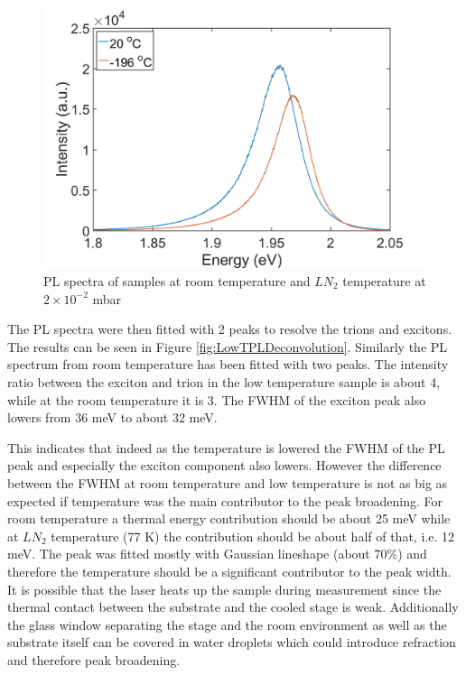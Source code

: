 \begin{figure}[!ht]
	\begin{center}
		\includegraphics[scale=0.4]{LowT/LowTPLComparison.png}
		\caption{PL spectra of samples at room temperature and $LN_2$ temperature at $2 \times 10^{-2}$ mbar}
		\label{fig:LowTPLComparison}
	\end{center}
\end{figure}

The PL spectra were then fitted with 2 peaks to resolve the trions and excitons. The results can be seen in Figure \ref{fig:LowTPLDeconvolution}. Similarly the PL spectrum from room temperature has been fitted with two peaks. The intensity ratio between the exciton and trion in the low temperature sample is about 4, while at the room temperature it is 3. The FWHM of the exciton peak also lowers from 36 meV to about 32 meV.

This indicates that indeed as the temperature is lowered the FWHM of the PL peak and especially the exciton component also lowers. However the difference between the FWHM at room temperature and low temperature is not as big as expected if temperature was the main contributor to the peak broadening. For room temperature a thermal energy contribution should be about 25 meV while at $LN_2$ temperature (77 K) the contribution should be about half of that, i.e. 12 meV. The peak was fitted mostly with Gaussian lineshape (about 70\%) and therefore the temperature should be a significant contributor to the peak width. It is possible that the laser heats up the sample during measurement since the thermal contact between the substrate and the cooled stage is weak. Additionally the glass window separating the stage and the room environment as well as the substrate itself can be covered in water droplets which could introduce refraction and therefore peak broadening.  

